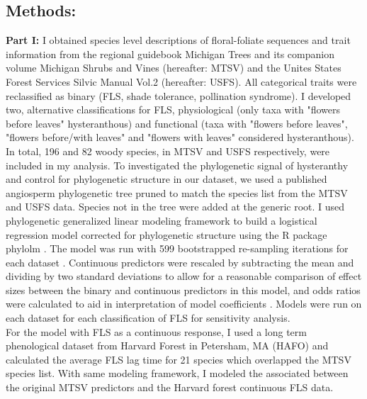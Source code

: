 \documentclass{article}\usepackage[]{graphicx}\usepackage[]{color}
\begin{document}
\subsection*{Methods:}
\indent\indent\textbf{Part I:} I obtained species level descriptions of floral-foliate sequences and trait information from the regional guidebook Michigan Trees \citep{Barnes2004} and its companion volume Michigan Shrubs and Vines \citep{Barnes2016} (hereafter: MTSV) and the Unites States Forest Services Silvic Manual Vol.2 \citep{Burns1990} (hereafter: USFS). All categorical traits were reclassified as binary (FLS, shade tolerance, pollination syndrome). I developed two, alternative classifications for FLS, physiological (only taxa with "flowers before leaves" hysteranthous) and functional (taxa with "flowers before leaves", "flowers before/with leaves" and "flowers with leaves" considered hysteranthous). In total, 196 and 82 woody species, in MTSV and USFS respectively, were included in my analysis. To investigated the phylogenetic signal of hysteranthy and control for phylogenetic structure in our dataset, we used a published angiosperm phylogenetic tree \citep{Zanne2013} pruned to match the species list from the MTSV  and USFS data. Species not in the tree were added at the generic root. I used phylogenetic generalized linear modeling framework \citep{Ives2010} to build a logistical regression model corrected for phylogenetic structure using the R package phylolm \citep{Ho2014}. The model was run with 599 bootstrapped re-sampling iterations for each dataset \citep{Wilcox2010}. Continuous predictors were rescaled by subtracting the mean and dividing by two standard deviations to allow for a reasonable comparison of effect sizes between the binary and continuous predictors in this model, and odds ratios were calculated to aid in interpretation of model coefficients \citep{Gelman2007}. Models were run on each dataset for each classification of FLS for sensitivity analysis.\\ 
\indent For the model with FLS as a continuous response, I used a long term phenological dataset from Harvard Forest in Petersham, MA (HAFO) \citep{Okeefe2015} and calculated the average FLS lag time for 21 species which overlapped the MTSV species list. With same modeling framework, I modeled the associated between the original MTSV predictors and the Harvard forest continuous FLS data.
\end{document}
